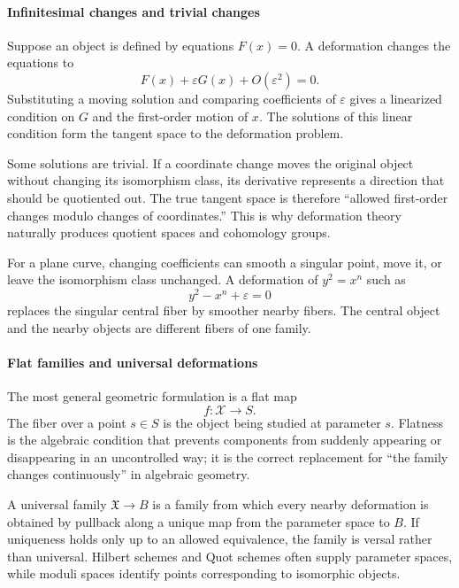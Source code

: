 \paragraph{Infinitesimal changes and trivial changes}

Suppose an object is defined by equations $F(x)=0$. A deformation changes the equations to
\[
 F(x)+\varepsilon G(x)+O(\varepsilon^2)=0.
\]
Substituting a moving solution and comparing coefficients of $\varepsilon$ gives a linearized condition on $G$ and the first-order motion of $x$. The solutions of this linear condition form the tangent space to the deformation problem.

Some solutions are trivial. If a coordinate change moves the original object without changing its isomorphism class, its derivative represents a direction that should be quotiented out. The true tangent space is therefore “allowed first-order changes modulo changes of coordinates.” This is why deformation theory naturally produces quotient spaces and cohomology groups.

For a plane curve, changing coefficients can smooth a singular point, move it, or leave the isomorphism class unchanged. A deformation of $y^2=x^n$ such as
\[
 y^2-x^n+\varepsilon=0
\]
replaces the singular central fiber by smoother nearby fibers. The central object and the nearby objects are different fibers of one family.

\paragraph{Flat families and universal deformations}

The most general geometric formulation is a flat map
\[
 f:\mathcal X\longrightarrow S.
\]
The fiber over a point $s\in S$ is the object being studied at parameter $s$. Flatness is the algebraic condition that prevents components from suddenly appearing or disappearing in an uncontrolled way; it is the correct replacement for “the family changes continuously” in algebraic geometry.

A universal family $\mathfrak X\to B$ is a family from which every nearby deformation is obtained by pullback along a unique map from the parameter space to $B$. If uniqueness holds only up to an allowed equivalence, the family is versal rather than universal. Hilbert schemes and Quot schemes often supply parameter spaces, while moduli spaces identify points corresponding to isomorphic objects. \cite{deformation_theory_ref1,deformation_theory_ref3}

